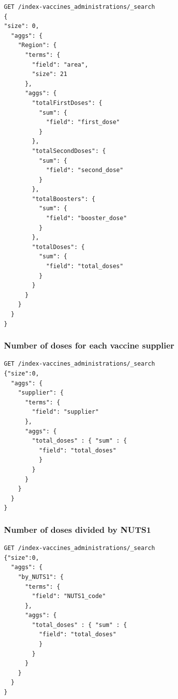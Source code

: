 \documentclass[12pt, a4paper]{article}
\begin{document}
\begin{tcolorbox}[fontupper=\scriptsize]
    \begin{verbatim}
GET /index-vaccines_administrations/_search
{
"size": 0, 
  "aggs": {
    "Region": {
      "terms": {
        "field": "area",
        "size": 21
      },
      "aggs": {
        "totalFirstDoses": {
          "sum": {
            "field": "first_dose"
          }
        },        
        "totalSecondDoses": {
          "sum": {
            "field": "second_dose"
          }
        },        
        "totalBoosters": {
          "sum": {
            "field": "booster_dose"
          }
        },        
        "totalDoses": {
          "sum": {
            "field": "total_doses"
          }
        }
      }
    }
  } 
}

    \end{verbatim}
\end{tcolorbox}

\subsubsection{Number of doses for each vaccine supplier}

\begin{tcolorbox}[fontupper=\scriptsize]
    \begin{verbatim}
GET /index-vaccines_administrations/_search
{"size":0,
  "aggs": {
    "supplier": {
      "terms": {
        "field": "supplier"
      },
      "aggs": {
        "total_doses" : { "sum" : {
          "field": "total_doses"
          }
        }
      }
    }
  }
}

    \end{verbatim}
\end{tcolorbox}

\subsubsection{Number of doses divided by NUTS1}

\begin{tcolorbox}[fontupper=\scriptsize]
    \begin{verbatim}
GET /index-vaccines_administrations/_search
{"size":0,
  "aggs": {
    "by_NUTS1": {
      "terms": {
        "field": "NUTS1_code"
      },
      "aggs": {
        "total_doses" : { "sum" : {
          "field": "total_doses"
          }
        }
      }
    }
  }
}
    \end{verbatim}
\end{tcolorbox}
\end{document}
